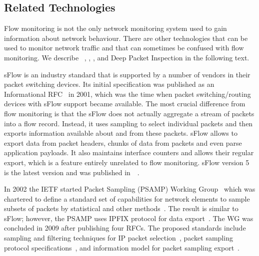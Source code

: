 \subsection{Related Technologies}

Flow monitoring is not the only network monitoring system used to gain information about network behaviour. There are other technologies that can be used to monitor network traffic and that can sometimes be confused with flow monitoring. We describe ~\cite{Phaal-2004-sFlow}, , , and Deep Packet Inspection in the following text.

sFlow is an industry standard that is supported by a number of vendors in their packet switching devices. Its initial specification was published as an Informational RFC~\cite{rfc3176} in 2001, which was the time when packet switching/routing devices with sFlow support became available. The most crucial difference from flow monitoring is that the sFlow does not actually aggregate a stream of packets into a flow record. Instead, it uses sampling to select individual packets and then exports information available about and from these packets. sFlow allows to export data from packet headers, chunks of data from packets and even parse application payloads. It also maintains interface counters and allows their regular export, which is a feature entirely unrelated to flow monitoring. sFlow version 5 is the latest version and was published in~\citeyear{Phaal-2004-sFlow}~\cite{Phaal-2004-sFlow}.

In 2002 the IETF started Packet Sampling (PSAMP) Working Group~\cite{IETF--Packet} which was chartered to define a standard set of capabilities for network elements to sample subsets of packets by statistical and other methods~\cite{IESG--Packet}. The result is similar to sFlow; however, the PSAMP uses IPFIX protocol for data export~\cite{rfc5477}. The WG was concluded in 2009 after publishing four RFCs. The proposed standards include sampling and filtering techniques for IP packet selection~\cite{rfc5475}, packet sampling protocol specifications~\cite{rfc5476}, and information model for packet sampling export~\cite{rfc5477}.

